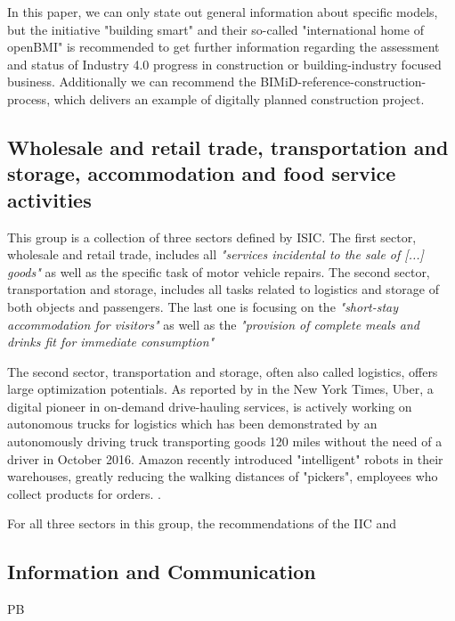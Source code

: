 In this paper, we can only state out general information about specific models, but the initiative "building smart" %
and their so-called "international home of openBMI" is recommended to get further information regarding the assessment and status of Industry 4.0 progress in construction or building-industry focused business. Additionally we can recommend the BIMiD-reference-construction-process, which delivers an example of digitally planned construction project. %

   


\subsection{Wholesale and retail trade, transportation and storage, accommodation and food service activities}

This group is a collection of three sectors defined by \ac{ISIC}. The first sector, wholesale and retail trade, includes all \emph{"services incidental to the sale of [...] goods"}\cite[p.179]{ISIC:2008} as well as the specific task of motor vehicle repairs. The second sector, transportation and storage, includes all tasks related to logistics and storage of both objects and passengers.\cite[p.194]{ISIC:2008} The last one is focusing on the \emph{"short-stay accommodation for visitors"} as well as the \emph{"provision of complete meals and drinks fit for immediate consumption"}\cite[p.202]{ISIC:2008} 

The second sector, transportation and storage, often also called logistics, offers large optimization potentials. As reported by \citeauthor{nytimesdrivingtruck:2016} in the New York Times, Uber, a digital pioneer in on-demand drive-hauling services, is actively working on autonomous trucks for logistics which has been demonstrated by an autonomously driving truck transporting goods 120 miles without the need of a driver in October 2016. Amazon recently introduced "intelligent" robots in their warehouses, greatly reducing the walking distances of "pickers", employees who collect products for orders. \cite{Kiva:amazon:Ma:2016:OTA:2936924.2937092}. 

For all three sectors in this group, the recommendations of the \ac{IIC} and \cite{I4.0Init}



\subsection{Information and Communication}
PB

